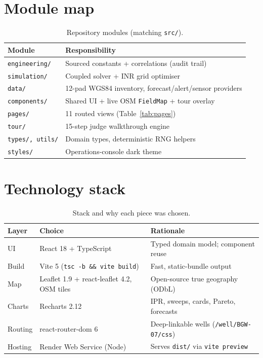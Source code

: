 \documentclass[12pt,a4paper]{report}
\begin{document}
\section{Module map}
\begin{table}[h]
\centering
\caption{Repository modules (matching \texttt{src/}).\label{tab:modules}}
\begin{tabular}{lp{9.5cm}}
\toprule
\textbf{Module} & \textbf{Responsibility} \\ \midrule
\texttt{engineering/} & Sourced constants + correlations (audit trail) \\
\texttt{simulation/} & Coupled solver + INR grid optimiser \\
\texttt{data/} & 12-pad WGS84 inventory, forecast/alert/sensor providers \\
\texttt{components/} & Shared UI + live OSM \texttt{FieldMap} + tour overlay \\
\texttt{pages/} & 11 routed views (Table~\ref{tab:pages}) \\
\texttt{tour/} & 15-step judge walkthrough engine \\
\texttt{types/, utils/} & Domain types, deterministic RNG helpers \\
\texttt{styles/} & Operations-console dark theme \\
\bottomrule
\end{tabular}
\end{table}

\section{Technology stack}
\begin{table}[h]
\centering
\caption{Stack and why each piece was chosen.\label{tab:stack}}
\begin{tabular}{llp{7cm}}
\toprule
\textbf{Layer} & \textbf{Choice} & \textbf{Rationale} \\ \midrule
UI & React 18 + TypeScript & Typed domain model; component reuse \\
Build & Vite 5 (\texttt{tsc -b \&\& vite build}) & Fast, static-bundle output \\
Map & Leaflet 1.9 + react-leaflet 4.2, OSM tiles & Open-source true geography (ODbL) \\
Charts & Recharts 2.12 & IPR, sweeps, cards, Pareto, forecasts \\
Routing & react-router-dom 6 & Deep-linkable wells (\texttt{/well/BGW-07/css}) \\
Hosting & Render Web Service (Node) & Serves \texttt{dist/} via \texttt{vite preview} \\
\bottomrule
\end{tabular}
\end{table}
\end{document}
